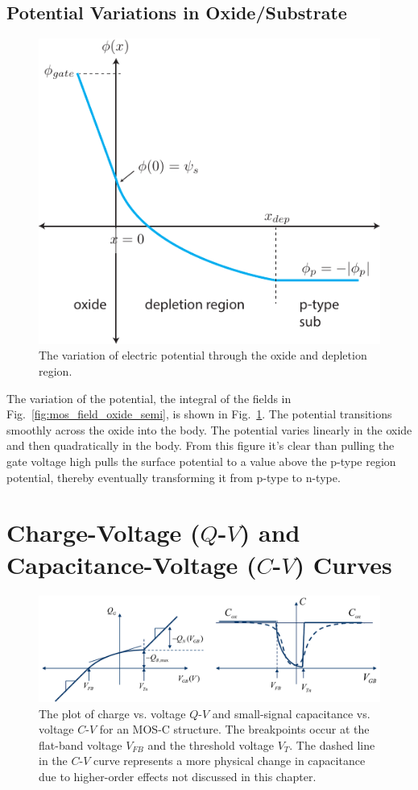 \subsection{Potential Variations in Oxide/Substrate}

\begin{figure}[tbh]
\begin{center}
\includegraphics[width=.5\columnwidth]{MOS_potential}
\end{center}
\caption{The variation of electric potential through the oxide and depletion region. } \label{fig:MOS_potential}
\end{figure}

The variation of the potential, the integral of the fields in Fig.~\ref{fig:mos_field_oxide_semi}, is shown in Fig.~\ref{fig:MOS_potential}.  The potential transitions smoothly across the oxide into the body.  The potential varies linearly in the oxide and then quadratically in the body.  From this figure it's clear than pulling the gate voltage high pulls the surface potential to a value above the p-type region potential, thereby eventually transforming it from p-type to n-type. 


\section{Charge-Voltage ($Q$-$V$) and Capacitance-Voltage ($C$-$V$) Curves}


\begin{figure}[tbh]
\begin{center}
\includegraphics[width=\columnwidth]{mos_qv_cv}
\end{center}
\caption{The plot of charge vs. voltage $Q$-$V$ and small-signal capacitance vs. voltage $C$-$V$ for an MOS-C structure.  The breakpoints occur at the flat-band voltage $V_{FB}$ and the threshold voltage $V_T$.  The dashed line in the $C$-$V$ curve represents a more physical change in capacitance due to higher-order effects not discussed in this chapter. } \label{fig:mos_qv_cv}
\end{figure}

